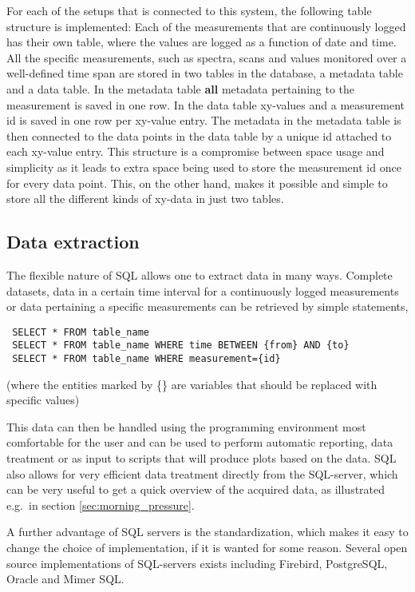 For each of the setups that is connected to this system, the following table
structure is implemented: Each of the measurements that are continuously logged
has their own table, where the values are logged as a function of date and
time. All the specific measurements, such as spectra, scans and values
monitored over a well-defined time span are stored in two tables in the
database, a metadata table and a data table. In the metadata table \textbf{all}
metadata pertaining to the measurement is saved in one row. In the data table
xy-values and a measurement id is saved in one row per xy-value entry. The
metadata in the metadata table is then connected to the data points in the data
table by a unique id attached to each xy-value entry. This structure is a
compromise between space usage and simplicity as it leads to extra space being
used to store the measurement id once for every data point. This, on the other
hand, makes it possible and simple to store all the different kinds of xy-data
in just two tables.

\subsection{Data extraction} \label{sec:data_extraction}
The flexible nature of SQL allows one to extract data in many ways. Complete
datasets, data in a certain time interval for a continuously logged
measurements or data pertaining a specific measurements can be retrieved by
simple statements, 
\begin{verbatim}
 SELECT * FROM table_name
 SELECT * FROM table_name WHERE time BETWEEN {from} AND {to}
 SELECT * FROM table_name WHERE measurement={id}
\end{verbatim}
(where the entities marked by \{\} are variables that should be
replaced with specific values)

This data can then be handled using the programming environment most
comfortable for the user and can be used to perform automatic reporting, data
treatment or as input to scripts that will produce plots based on the data. SQL
also allows for very efficient data treatment directly from the SQL-server,
which can be very useful to get a quick overview of the acquired data, as
illustrated e.g.\ in section \ref{sec:morning_pressure}.

A further advantage of SQL servers is the standardization, which makes it easy
to change the choice of implementation, if it is wanted for some reason.
Several open source implementations of SQL-servers exists including Firebird,
PostgreSQL, Oracle and Mimer SQL.
